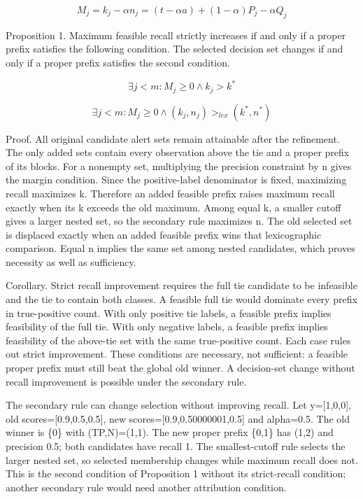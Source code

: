 \documentclass[11pt,a4paper]{article}
\begin{document}
\[{M}_{j} = {k}_{j} - \alpha {n}_{j} = (t - \alpha a) + (1 - \alpha ){P}_{j} - \alpha {Q}_{j}\]

Proposition 1. Maximum feasible recall strictly increases if and only if a proper prefix satisfies the following condition. The selected decision set changes if and only if a proper prefix satisfies the second condition.

\[\exists  j < m: {M}_{j} \geq  0  \land   {k}_{j} > {k}^{*}\]

\[\exists  j < m: {M}_{j} \geq  0  \land   ({k}_{j}, {n}_{j}) {>}_{lex} ({k}^{*}, {n}^{*})\]

Proof. All original candidate alert sets remain attainable after the refinement. The only added sets contain every observation above the tie and a proper prefix of its blocks. For a nonempty set, multiplying the precision constraint by n gives the margin condition. Since the positive-label denominator is fixed, maximizing recall maximizes k. Therefore an added feasible prefix raises maximum recall exactly when its k exceeds the old maximum. Among equal k, a smaller cutoff gives a larger nested set, so the secondary rule maximizes n. The old selected set is displaced exactly when an added feasible prefix wins that lexicographic comparison. Equal n implies the same set among nested candidates, which proves necessity as well as sufficiency.

Corollary. Strict recall improvement requires the full tie candidate to be infeasible and the tie to contain both classes. A feasible full tie would dominate every prefix in true-positive count. With only positive tie labels, a feasible prefix implies feasibility of the full tie. With only negative labels, a feasible prefix implies feasibility of the above-tie set with the same true-positive count. Each case rules out strict improvement. These conditions are necessary, not sufficient: a feasible proper prefix must still beat the global old winner. A decision-set change without recall improvement is possible under the secondary rule.

The secondary rule can change selection without improving recall. Let y=[1,0,0], old scores=[0.9,0.5,0.5], new scores=[0.9,0.50000001,0.5] and alpha=0.5. The old winner is \{0\} with (TP,N)=(1,1). The new proper prefix \{0,1\} has (1,2) and precision 0.5; both candidates have recall 1. The smallest-cutoff rule selects the larger nested set, so selected membership changes while maximum recall does not. This is the second condition of Proposition 1 without its strict-recall condition; another secondary rule would need another attribution condition.
\end{document}

